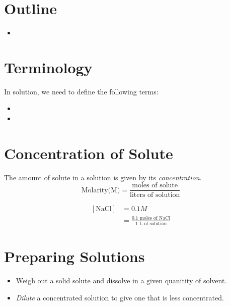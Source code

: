 \documentclass{chem122notes}
\begin{document}
\section{Outline}\label{sec:outline}
\begin{itemize}
	\item 
\end{itemize}

\section{Terminology}\label{sec:terminology}
In solution, we need to define the following terms:
\begin{itemize}
	\item {}
	\item {}
\end{itemize}

\section{Concentration of Solute}\label{sec:concentration-of-solute}
The amount of solute in a solution is given by its \emph{concentration}.
\begin{equation}
	\mbox{Molarity(M)} = \frac{\mbox{moles of solute}}{\mbox{liters of solution}}
	\label{eq:molarity}
\end{equation}

\begin{equation*}
\begin{aligned}
	[\mbox{NaCl}] &= 0.1 M\\
		      &= \frac{0.1 \mbox{ moles of NaCl}}{1 \mbox{ L of solution}}
\end{aligned}
\end{equation*}

\section{Preparing Solutions}\label{sec:preparing-solutions}
\begin{itemize}
	\item Weigh out a solid solute and dissolve in a given quanitity of solvent.
	\item \emph{Dilute} a concentrated solution to give one that is less concentrated.
\end{itemize}
\end{document}
